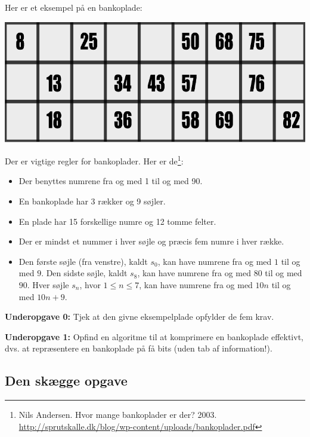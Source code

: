 Her er et eksempel på en bankoplade:

\begin{center}
\includegraphics[width=.99\textwidth]{bankoplade.pdf}
\end{center}

Der er vigtige regler for bankoplader.  Her er de\footnote{Nils Andersen.  Hvor
mange bankoplader er der?  2003.\\
\tiny{\url{http://sprutskalle.dk/blog/wp-content/uploads/bankoplader.pdf}}}:

\begin{itemize}
\item Der benyttes numrene fra og med 1 til og med 90.
\item En bankoplade har 3 rækker og 9 søjler.
\item En plade har 15 forskellige numre og 12 tomme felter.
\item Der er mindst et nummer i hver søjle og præcis fem numre i hver række.
\item Den første søjle (fra venstre), kaldt $s_0$, kan have numrene fra og med
$1$ til og med $9$.  Den sidste søjle, kaldt $s_8$, kan have numrene fra og med
$80$ til og med $90$.  Hver søjle $s_n$, hvor $1 \leq n \leq 7$, kan have
numrene fra og med $10n$ til og med $10n + 9$.
\end{itemize}

\textbf{Underopgave 0:} Tjek at den givne eksempelplade opfylder de fem krav.

\textbf{Underopgave 1:} Opfind en algoritme til at komprimere en bankoplade
effektivt, dvs. at repræsentere en bankoplade på få bits (uden tab af
information!).


\newpage

\subsection{Den skægge opgave}


